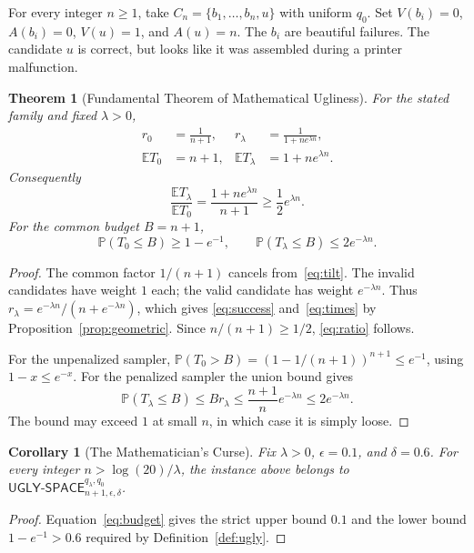 \documentclass[11pt]{article}
\newtheorem{theorem}[definition]{Theorem}
\newtheorem{corollary}[definition]{Corollary}
\theoremstyle{remark}
\newcommand{\E}{\mathbb{E}}
\newcommand{\Prb}{\mathbb{P}}
\newcommand{\ugly}{\mathsf{UGLY\text{-}SPACE}}
\begin{document}
For every integer $n\geq1$, take
$C_n=\{b_1,\ldots,b_n,u\}$ with uniform $q_0$. Set
$V(b_i)=0$, $A(b_i)=0$, $V(u)=1$, and $A(u)=n$.
The $b_i$ are beautiful failures. The candidate $u$ is correct, but looks
like it was assembled during a printer malfunction.

\begin{theorem}[Fundamental Theorem of Mathematical Ugliness]\label{thm:fundamental}
For the stated family and fixed $\lambda>0$,
\begin{align}
 r_0&=\frac{1}{n+1},
 &r_\lambda&=\frac{1}{1+n e^{\lambda n}},\label{eq:success}\\
 \E T_0&=n+1,
 &\E T_\lambda&=1+n e^{\lambda n}.\label{eq:times}
\end{align}
Consequently
\begin{equation}\label{eq:ratio}
 \frac{\E T_\lambda}{\E T_0}
 =\frac{1+n e^{\lambda n}}{n+1}
 \geq\frac12 e^{\lambda n}.
\end{equation}
For the common budget $B=n+1$,
\begin{equation}\label{eq:budget}
 \Prb(T_0\leq B)\geq1-e^{-1},\qquad
 \Prb(T_\lambda\leq B)\leq2e^{-\lambda n}.
\end{equation}
\end{theorem}
\begin{proof}
The common factor $1/(n+1)$ cancels from~\eqref{eq:tilt}. The invalid
candidates have weight $1$ each; the valid candidate has weight
$e^{-\lambda n}$. Thus
$r_\lambda=e^{-\lambda n}/(n+e^{-\lambda n})$, which gives
\eqref{eq:success} and~\eqref{eq:times} by
Proposition~\ref{prop:geometric}. Since $n/(n+1)\geq1/2$,
\eqref{eq:ratio} follows.

For the unpenalized sampler,
$\Prb(T_0>B)=(1-1/(n+1))^{n+1}\leq e^{-1}$, using
$1-x\leq e^{-x}$. For the penalized sampler the union bound gives
\[
 \Prb(T_\lambda\leq B)\leq B r_\lambda
 \leq\frac{n+1}{n}e^{-\lambda n}\leq2e^{-\lambda n}.
\]
The bound may exceed $1$ at small $n$, in which case it is simply loose.
\end{proof}

\begin{corollary}[The Mathematician's Curse]
Fix $\lambda>0$, $\epsilon=0.1$, and $\delta=0.6$. For every integer
$n>\log(20)/\lambda$, the instance above belongs to
$\ugly^{q_\lambda,q_0}_{n+1,\epsilon,\delta}$.
\end{corollary}
\begin{proof}
Equation~\eqref{eq:budget} gives the strict upper bound $0.1$ and the
lower bound $1-e^{-1}>0.6$ required by Definition~\ref{def:ugly}.
\end{proof}
\end{document}
